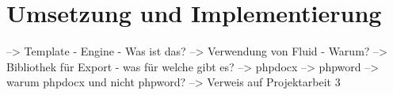 \chapter{Umsetzung und Implementierung}\label{umsetzung} 


--> Template - Engine - Was ist das?
    --> Verwendung von Fluid - Warum?
--> Bibliothek für Export - was für welche gibt es?
    --> phpdocx
    --> phpword
    --> warum phpdocx und nicht phpword? --> Verweis auf Projektarbeit 3
    
